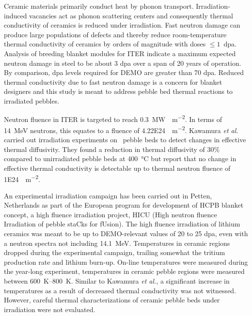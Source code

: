 \documentclass[11pt]{report} %
\newcommand{\lit}{\ce{Li2TiO3}}
\begin{document}
Ceramic materials primarily conduct heat by phonon transport. Irradiation-induced vacancies act as phonon scattering centers and consequently thermal conductivity of ceramics is reduced under irradiation.\cite{Hopkins1985} Fast neutron damage can produce large populations of defects and thereby reduce room-temperature thermal conductivity of ceramics by orders of magnitude with doses $\le 1$~dpa.\cite{Snead2005} Analysis of breeding blanket modules for ITER indicate a maximum expected neutron damage in steel to be about 3 dpa over a span of 20 years of operation. By comparison, dpa levels required for DEMO are greater than 70 dpa.\cite{Giancarli2006a} Reduced thermal conductivity due to fast neutron damage is a concern for blanket designers and this study is meant to address pebble bed thermal reactions to irradiated pebbles.

Neutron fluence in ITER is targeted to reach \SI{0.3}{\mega\watt\year\per\square\meter}.\cite{Abdou2015,VanHoutte2011} In terms of \SI{14}{\mega\electronvolt} neutrons, this equates to a fluence of \SI{4.22E24}{\neutron\per\meter\squared}. Kawamura \textit{et al.} carried out irradiation experiments on \lit~pebble beds to detect changes in effective thermal diffusivity. They found a reduction in thermal diffusivity of 30\% compared to unirradiated pebble beds at \SI{400}{\celsius} but report that no change in effective thermal conductivity is detectable up to thermal neutron fluence of \SI{1E24}{\neutron\per\meter\squared}. 

An experimental irradiation campaign has been carried out in Petten, Netherlands as part of the European program for development of HCPB blanket concept, a high fluence irradiation project, HICU (High neutron fluence Irradiation of pebble staCks for fUsion). The high fluence irradiation of lithium ceramics was meant to be up to DEMO-relevant values of 20 to 25 dpa, even with a neutron spectra not including \SI{14.1}{\mega\electronvolt}.\cite{Hegeman2003,VanTil2012} Temperatures in ceramic regions dropped during the experimental campaign, trailing somewhat the tritium production rate and lithium burn-up. On-line temperatures were measured during the year-long experiment, temperatures in ceramic pebble regions were measured between \SIrange{600}{800}{\kelvin}. Similar to Kawamura \textit{et al.}, a significant increase in temperatures as a result of decreased thermal conductivity was not witnessed. However, careful thermal characterizations of ceramic pebble beds under irradiation were not evaluated.
\end{document}
